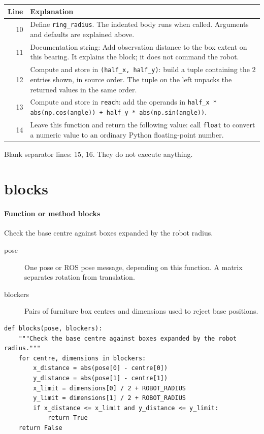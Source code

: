 \documentclass[11pt,a4paper]{book}
\begin{document}
\begin{longtable}{r p{}}

\textbf{Line} & \textbf{Explanation} \\ \hline \endhead

10 & Define \texttt{ring\_radius}. The indented body runs when called. Arguments and defaults are explained above. \\

11 & Documentation string: Add observation distance to the box extent on this bearing. It explains the block; it does not command the robot. \\

12 & Compute and store in \texttt{(half\_x, half\_y)}: build a tuple containing the 2 entries shown, in source order. The tuple on the left unpacks the returned values in the same order. \\

13 & Compute and store in \texttt{reach}: add the operands in \texttt{half\_x * abs(np.cos(angle)) + half\_y * abs(np.sin(angle))}.  \\

14 & Leave this function and return the following value: call \texttt{float} to convert a numeric value to an ordinary Python floating-point number. \\

\end{longtable}

Blank separator lines: 15, 16. They do not execute anything.

\section{blocks}

\paragraph{Function or method blocks}
Check the base centre against boxes expanded by the robot radius.

\begin{description}
\item[pose] One pose or ROS pose message, depending on this function. A matrix separates rotation from translation.
\item[blockers] Pairs of furniture box centres and dimensions used to reject base positions.
\end{description}

\begin{lstlisting}[firstnumber=17]
def blocks(pose, blockers):
    """Check the base centre against boxes expanded by the robot radius."""
    for centre, dimensions in blockers:
        x_distance = abs(pose[0] - centre[0])
        y_distance = abs(pose[1] - centre[1])
        x_limit = dimensions[0] / 2 + ROBOT_RADIUS
        y_limit = dimensions[1] / 2 + ROBOT_RADIUS
        if x_distance <= x_limit and y_distance <= y_limit:
            return True
    return False


\end{lstlisting}
\end{document}
